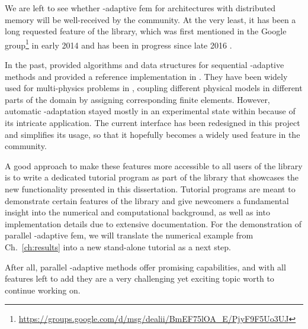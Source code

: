 
We are left to see whether \hp-adaptive \gls{fem} for architectures with distributed memory will be well-received by the community. At the very least, it has been a long requested feature of the \dealii{} library, which was first mentioned in the \dealii{} Google group\footnote{\url{https://groups.google.com/d/msg/dealii/BmEF75lOA_E/PjyF9F5Uo3UJ}} in early 2014 and has been in progress since late 2016 \textcite{dealiiissue3511}.

In the past, \textcite{bangerth2009} provided algorithms and data structures for sequential \hp-adaptive methods and provided a reference implementation in \dealii{}. They have been widely used for multi-physics problems in \dealii{}, coupling different physical models in different parts of the domain by assigning corresponding finite elements. However, automatic \hp-adaptation stayed mostly in an experimental state within \dealii{} because of its intricate application. The current interface has been redesigned in this project and simplifies its usage, so that it hopefully becomes a widely used feature in the community.

A good approach to make these features more accessible to all users of the library is to write a dedicated tutorial program as part of the \dealii{} library that showcases the new functionality presented in this dissertation. Tutorial programs are meant to demonstrate certain features of the library and give newcomers a fundamental insight into the numerical and computational background, as well as into implementation details due to extensive documentation.
For the demonstration of parallel \hp-adaptive \gls{fem}, we will translate the numerical example from Ch.~\ref{ch:results} into a new stand-alone tutorial as a next step.






After all, parallel \hp-adaptive methods offer promising capabilities, and with all features left to add they are a very challenging yet exciting topic worth to continue working on.

